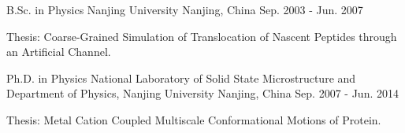 

\begin{cventries}

  \cventry
    {B.Sc. in Physics} %
    {Nanjing University} %
    {Nanjing, China} %
    {Sep. 2003 - Jun. 2007} %
    {
      \begin{cvitems} %
        \item {Thesis: Coarse-Grained Simulation of Translocation of Nascent Peptides through an Artificial Channel.}
      \end{cvitems}
    }

  \cventry
    {Ph.D. in Physics} %
    {National Laboratory of Solid State Microstructure and Department of Physics, Nanjing University} %
    {Nanjing, China} %
    {Sep. 2007 - Jun. 2014} %
    {
      \begin{cvitems} %
        \item {Thesis: Metal Cation Coupled Multiscale Conformational Motions of Protein.}
      \end{cvitems}
    }

\end{cventries}
